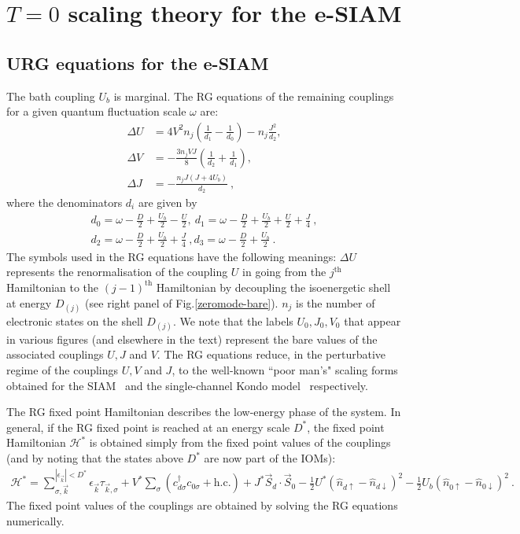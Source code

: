 \section{\(T=0\) scaling theory for the e-SIAM}
\label{urg-theory}

\subsection{URG equations for the e-SIAM}

The bath coupling \(U_b\) is marginal. The RG equations of the remaining couplings for a given quantum fluctuation scale \(\omega\) are:
\begin{align}
	\Delta U &= 4V^2 n_j\left(\frac{1}{d_1} - \frac{1}{d_0}\right) - n_j\frac{J^2}{d_2},\nonumber\\
	\Delta V &= -\frac{3n_j VJ}{8}\left(\frac{1}{d_2} + \frac{1}{d_1}\right),\label{rg-eqn}\\
	\Delta J &= -\frac{n_j J\left(J + 4U_b\right)}{d_2}~,\nonumber
\end{align}
where the denominators \(d_i\) are given by
\begin{eqnarray}\label{rg-eqtn1}
	d_0 = \omega - \frac{D}{2} + \frac{U_b}{2} - \frac{U}{2},~d_1 = \omega - \frac{D}{2} + \frac{U_b}{2} + \frac{U}{2} + \frac{J}{4}~,\\
	d_2 = \omega - \frac{D}{2} + \frac{U_b}{2} + \frac{J}{4}~,d_3 = \omega - \frac{D}{2} + \frac{U_b}{2}~.
\end{eqnarray}
The symbols used in the RG equations have the following meanings: \(\Delta U\) represents the renormalisation of the coupling \(U\) in going from the \(j^\text{th}\) Hamiltonian to the \(\left( j-1 \right) ^\text{th}\) Hamiltonian by decoupling the isoenergetic shell at energy \(D_{(j)}\) (see right panel of Fig.\eqref{zeromode-bare}). \(n_j\) is the number of electronic states on the shell \(D_{(j)}\). We note that the labels \(U_0,J_0,V_0\) that appear in various figures (and elsewhere in the text) represent the bare values of the associated couplings \(U,J\) and \(V\). The RG equations reduce, in the perturbative regime of the couplings $U, V$ and $J$, to the well-known ``poor man's" scaling forms obtained for the  SIAM~\cite{haldane1978scaling} and the single-channel Kondo model~\cite{anderson1970} respectively.

 The RG fixed point Hamiltonian describes the low-energy phase of the system. In general, if the RG fixed point is reached at an energy scale \(D^*\), the fixed point Hamiltonian \(\mathcal{H}^*\) is obtained simply from the fixed point values of the couplings (and by noting that the states above \(D^*\) are now part of the IOMs):
\begin{eqnarray}
	\label{fixed-point-ham}
	\mathcal{H}^* = \sum_{\sigma,\vec k}^{|\epsilon_{\vec k}| < D^*} \epsilon_{\vec k} \tau_{\vec k,\sigma} + V^*\sum_\sigma \left( c^\dagger_{d\sigma}c_{0\sigma} + \text{h.c.}\right) + J^* \vec{S}_d\cdot\vec{S}_0\nonumber - \frac{1}{2}U^*\left(\hat n_{d \uparrow} - \hat n_{d \downarrow}\right)^2 - \frac{1}{2}U_b \left(\hat n_{0 \uparrow} - \hat n_{0 \downarrow}\right)^2~.
\end{eqnarray}
The fixed point values of the couplings are obtained by solving the RG equations numerically.

